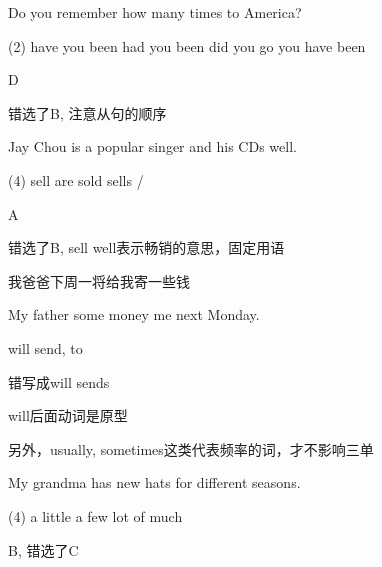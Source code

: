 \begin{question}[tags={xiaoxuect}]
Do you remember how many times \blank[width=1cm]{} to America?

  \begin{tasks}(2)
    \task have you been
    \task had you been
    \task did you go
    \task you have been
  \end{tasks}

\end{question}
\begin{solution}
D

错选了B, 注意从句的顺序
\end{solution}


\begin{question}[tags={xiaoxuect}]
Jay Chou is a popular singer and his CDs \blank[width=1cm]{} well.

  \begin{tasks}(4)
    \task sell
    \task are sold
    \task sells
    \task /
  \end{tasks}

\end{question}
\begin{solution}
A

错选了B, sell well表示畅销的意思，固定用语
\end{solution}

\begin{question}[tags={xiaoxuect}]

\noindent 我爸爸下周一将给我寄一些钱

\noindent My father \blank*[width=1.4cm]{} \blank[width=1.4cm]{} some money \blank[width=1.4cm]{} me next Monday.

\end{question}
\begin{solution}
will send, to

错写成will sends

will后面动词是原型

另外，usually, sometimes这类代表频率的词，才不影响三单
\end{solution}

\begin{question}[tags={xiaoxuect}]
My grandma has \blank[width=1.0cm]{} new hats for different seasons.
  \begin{tasks}(4)
    \task a little
    \task a few
    \task lot of
    \task much
  \end{tasks}

\end{question}
\begin{solution}
B, 错选了C
\end{solution}

